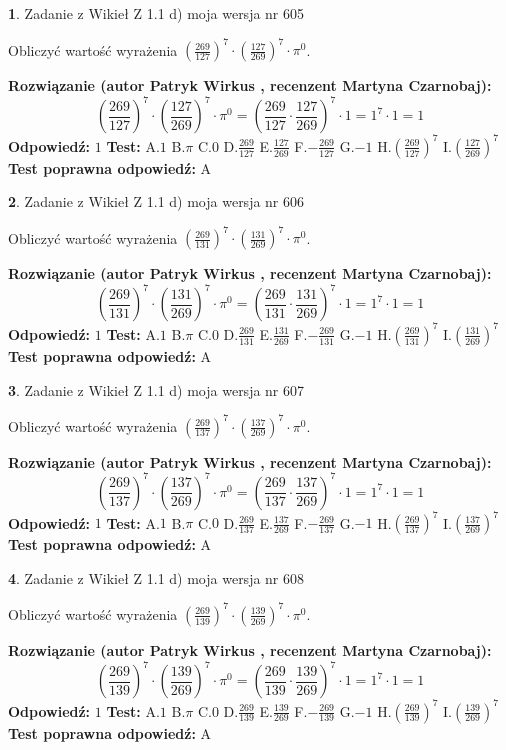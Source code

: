\documentclass[12pt, a4paper]{article}
\theoremstyle{definition} %
\newtheorem{zad}{}
\newcommand{\zadStart}[1]{\begin{zad}#1\newline}
\newcommand{\zadStop}{\end{zad}}
\newcommand{\rozwStart}[2]{\noindent \textbf{Rozwiązanie (autor #1 , recenzent #2): }\newline}
\newcommand{\rozwStop}{\newline}
\newcommand{\odpStart}{\noindent \textbf{Odpowiedź:}\newline}
\newcommand{\odpStop}{\newline}
\newcommand{\testStart}{\noindent \textbf{Test:}\newline}
\newcommand{\testStop}{\newline}
\newcommand{\kluczStart}{\noindent \textbf{Test poprawna odpowiedź:}\newline}
\newcommand{\kluczStop}{\newline}
\begin{document}
\zadStart{Zadanie z Wikieł Z 1.1 d) moja wersja nr 605}

Obliczyć wartość wyrażenia $(\frac{269}{127})^{7} \cdot (\frac{127}{269})^{7} \cdot \pi^{0}$.
\zadStop
\rozwStart{Patryk Wirkus}{Martyna Czarnobaj}
$$(\frac{269}{127})^{7} \cdot (\frac{127}{269})^{7} \cdot \pi^{0} = (\frac{269}{127} \cdot \frac{127}{269})^{7} \cdot 1 = 1^{7} \cdot 1 = 1$$
\rozwStop
\odpStart
$1$
\odpStop
\testStart
A.$1$ B.$\pi$ C.$0$ D.$\frac{269}{127}$ E.$\frac{127}{269}$
F.$-\frac{269}{127}$ G.$-1$
H.$(\frac{269}{127})^{7}$
I.$(\frac{127}{269})^{7}$
\testStop
\kluczStart
A
\kluczStop



\zadStart{Zadanie z Wikieł Z 1.1 d) moja wersja nr 606}

Obliczyć wartość wyrażenia $(\frac{269}{131})^{7} \cdot (\frac{131}{269})^{7} \cdot \pi^{0}$.
\zadStop
\rozwStart{Patryk Wirkus}{Martyna Czarnobaj}
$$(\frac{269}{131})^{7} \cdot (\frac{131}{269})^{7} \cdot \pi^{0} = (\frac{269}{131} \cdot \frac{131}{269})^{7} \cdot 1 = 1^{7} \cdot 1 = 1$$
\rozwStop
\odpStart
$1$
\odpStop
\testStart
A.$1$ B.$\pi$ C.$0$ D.$\frac{269}{131}$ E.$\frac{131}{269}$
F.$-\frac{269}{131}$ G.$-1$
H.$(\frac{269}{131})^{7}$
I.$(\frac{131}{269})^{7}$
\testStop
\kluczStart
A
\kluczStop



\zadStart{Zadanie z Wikieł Z 1.1 d) moja wersja nr 607}

Obliczyć wartość wyrażenia $(\frac{269}{137})^{7} \cdot (\frac{137}{269})^{7} \cdot \pi^{0}$.
\zadStop
\rozwStart{Patryk Wirkus}{Martyna Czarnobaj}
$$(\frac{269}{137})^{7} \cdot (\frac{137}{269})^{7} \cdot \pi^{0} = (\frac{269}{137} \cdot \frac{137}{269})^{7} \cdot 1 = 1^{7} \cdot 1 = 1$$
\rozwStop
\odpStart
$1$
\odpStop
\testStart
A.$1$ B.$\pi$ C.$0$ D.$\frac{269}{137}$ E.$\frac{137}{269}$
F.$-\frac{269}{137}$ G.$-1$
H.$(\frac{269}{137})^{7}$
I.$(\frac{137}{269})^{7}$
\testStop
\kluczStart
A
\kluczStop



\zadStart{Zadanie z Wikieł Z 1.1 d) moja wersja nr 608}

Obliczyć wartość wyrażenia $(\frac{269}{139})^{7} \cdot (\frac{139}{269})^{7} \cdot \pi^{0}$.
\zadStop
\rozwStart{Patryk Wirkus}{Martyna Czarnobaj}
$$(\frac{269}{139})^{7} \cdot (\frac{139}{269})^{7} \cdot \pi^{0} = (\frac{269}{139} \cdot \frac{139}{269})^{7} \cdot 1 = 1^{7} \cdot 1 = 1$$
\rozwStop
\odpStart
$1$
\odpStop
\testStart
A.$1$ B.$\pi$ C.$0$ D.$\frac{269}{139}$ E.$\frac{139}{269}$
F.$-\frac{269}{139}$ G.$-1$
H.$(\frac{269}{139})^{7}$
I.$(\frac{139}{269})^{7}$
\testStop
\kluczStart
A
\kluczStop
\end{document}
